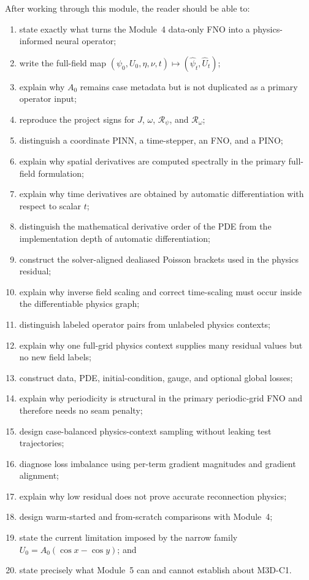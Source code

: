 \documentclass[11pt]{article}
\newcommand{\Rpsi}{\mathcal{R}_{\psi}}
\newcommand{\Romega}{\mathcal{R}_{\omega}}
\begin{document}
After working through this module, the reader should be able to:
\begin{enumerate}[label=\arabic*.]
  \item state exactly what turns the Module~4 data-only FNO into a physics-informed neural operator;
  \item write the full-field map $(\psi_0,U_0,\eta,\nu,t)\mapsto(\widehat\psi_t,\widehat U_t)$;
  \item explain why $A_0$ remains case metadata but is not duplicated as a primary operator input;
  \item reproduce the project signs for $J$, $\omega$, $\Rpsi$, and $\Romega$;
  \item distinguish a coordinate PINN, a time-stepper, an FNO, and a PINO;
  \item explain why spatial derivatives are computed spectrally in the primary full-field formulation;
  \item explain why time derivatives are obtained by automatic differentiation with respect to scalar $t$;
  \item distinguish the mathematical derivative order of the PDE from the implementation depth of automatic differentiation;
  \item construct the solver-aligned dealiased Poisson brackets used in the physics residual;
  \item explain why inverse field scaling and correct time-scaling must occur inside the differentiable physics graph;
  \item distinguish labeled operator pairs from unlabeled physics contexts;
  \item explain why one full-grid physics context supplies many residual values but no new field labels;
  \item construct data, PDE, initial-condition, gauge, and optional global losses;
  \item explain why periodicity is structural in the primary periodic-grid FNO and therefore needs no seam penalty;
  \item design case-balanced physics-context sampling without leaking test trajectories;
  \item diagnose loss imbalance using per-term gradient magnitudes and gradient alignment;
  \item explain why low residual does not prove accurate reconnection physics;
  \item design warm-started and from-scratch comparisons with Module~4;
  \item state the current limitation imposed by the narrow family $U_0=A_0(\cos x-\cos y)$; and
  \item state precisely what Module~5 can and cannot establish about M3D-C1.
\end{enumerate}
\end{document}
